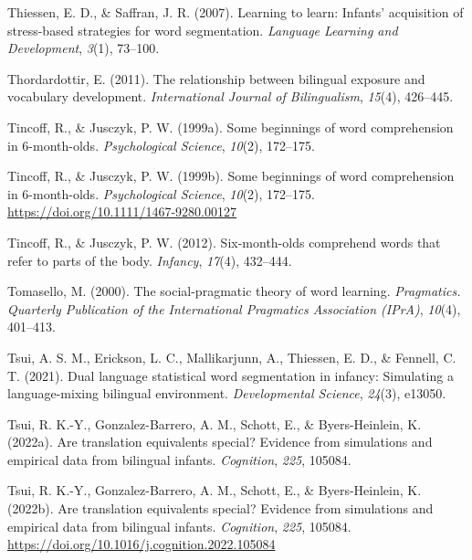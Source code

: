 \documentclass[
  12pt,
  b5paperpaper,
  twoside]{scrreprt}
\newlength{\cslhangindent}
\newlength{\cslentryspacingunit} %
\newenvironment{CSLReferences}[2] %
 {%
  \setlength{\parindent}{0pt}
  \ifodd #1
  \let\oldpar\par
  \def\par{\hangindent=\cslhangindent\oldpar}
  \fi
  \setlength{\parskip}{#2\cslentryspacingunit}
 }%
 {}
\begin{document}
\begin{CSLReferences}{1}{0}
\leavevmode{}%
Thiessen, E. D., \& Saffran, J. R. (2007). Learning to learn: Infants'
acquisition of stress-based strategies for word segmentation.
\emph{Language Learning and Development}, \emph{3}(1), 73--100.

\leavevmode{}%
Thordardottir, E. (2011). The relationship between bilingual exposure
and vocabulary development. \emph{International Journal of
Bilingualism}, \emph{15}(4), 426--445.

\leavevmode{}%
Tincoff, R., \& Jusczyk, P. W. (1999a). Some beginnings of word
comprehension in 6-month-olds. \emph{Psychological Science},
\emph{10}(2), 172--175.

\leavevmode{}%
Tincoff, R., \& Jusczyk, P. W. (1999b). Some beginnings of word
comprehension in 6-month-olds. \emph{Psychological Science},
\emph{10}(2), 172--175. \url{https://doi.org/10.1111/1467-9280.00127}

\leavevmode{}%
Tincoff, R., \& Jusczyk, P. W. (2012). Six-month-olds comprehend words
that refer to parts of the body. \emph{Infancy}, \emph{17}(4), 432--444.

\leavevmode{}%
Tomasello, M. (2000). The social-pragmatic theory of word learning.
\emph{Pragmatics. Quarterly Publication of the International Pragmatics
Association (IPrA)}, \emph{10}(4), 401--413.

\leavevmode{}%
Tsui, A. S. M., Erickson, L. C., Mallikarjunn, A., Thiessen, E. D., \&
Fennell, C. T. (2021). Dual language statistical word segmentation in
infancy: Simulating a language-mixing bilingual environment.
\emph{Developmental Science}, \emph{24}(3), e13050.

\leavevmode{}%
Tsui, R. K.-Y., Gonzalez-Barrero, A. M., Schott, E., \& Byers-Heinlein,
K. (2022a). Are translation equivalents special? Evidence from
simulations and empirical data from bilingual infants. \emph{Cognition},
\emph{225}, 105084.

\leavevmode{}%
Tsui, R. K.-Y., Gonzalez-Barrero, A. M., Schott, E., \& Byers-Heinlein,
K. (2022b). Are translation equivalents special? Evidence from
simulations and empirical data from bilingual infants. \emph{Cognition},
\emph{225}, 105084.
\url{https://doi.org/10.1016/j.cognition.2022.105084}


\end{CSLReferences}
\end{document}
